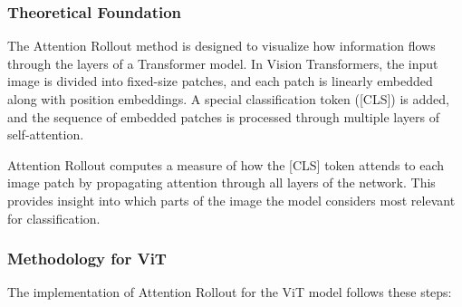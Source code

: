 \documentclass[a4paper,12pt]{report}
\begin{document}
\subsubsection{Theoretical Foundation}

The Attention Rollout method is designed to visualize how information flows through the layers of a Transformer model. In Vision Transformers, the input image is divided into fixed-size patches, and each patch is linearly embedded along with position embeddings. A special classification token ([CLS]) is added, and the sequence of embedded patches is processed through multiple layers of self-attention.

Attention Rollout computes a measure of how the [CLS] token attends to each image patch by propagating attention through all layers of the network. This provides insight into which parts of the image the model considers most relevant for classification.

\subsubsection{Methodology for ViT}

The implementation of Attention Rollout for the ViT model follows these steps:
\end{document}
